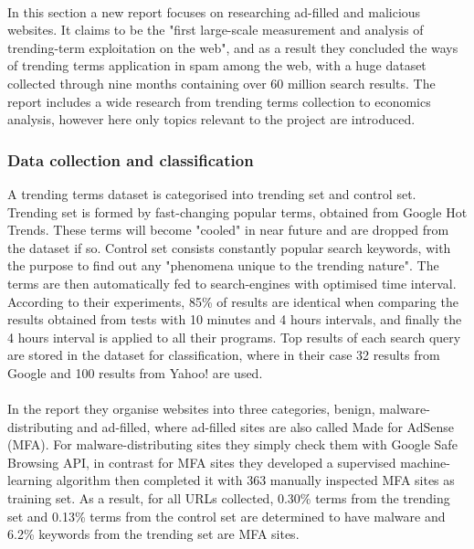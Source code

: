 \paragraph{}
In this section a new report focuses on researching ad-filled and malicious
websites.\cite{fashioncrime} It claims to be the "first large-scale measurement
and analysis of trending-term exploitation on the web", and as a result they
concluded the ways of trending terms application in spam among the web, with a
huge dataset collected through nine months containing over 60 million search
results. The report includes a wide research from trending terms collection to 
economics analysis, however here only topics relevant to the 
project are introduced. 
\subsubsection{Data collection and classification}
A trending terms dataset is categorised into trending set and control set. 
Trending set is formed by fast-changing popular terms, obtained from Google 
Hot Trends. These terms will become "cooled" in near future and are dropped 
from the dataset if so. Control set consists constantly popular search 
keywords, with the purpose to find out any "phenomena unique to the trending 
nature".\cite{fashioncrime} The terms are then automatically fed to search-engines with optimised 
time interval. According to their experiments, 85\% of results are identical 
when comparing the results obtained from tests with 10 minutes and 4 hours 
intervals, and finally the 4 hours interval is applied to all their programs. Top 
results of each search query are stored in the dataset for classification, 
where in their case 32 results from Google and 100 results from Yahoo! are used.
\paragraph{}
In the report they organise websites into three categories, benign, 
malware-distributing and ad-filled, where ad-filled sites are also called Made 
for AdSense (MFA). For malware-distributing sites they simply check them with 
Google Safe Browsing API, in contrast for MFA sites they developed a 
supervised machine-learning algorithm then completed it with 363 manually 
inspected MFA sites as training set. As a result, for all URLs collected, 
0.30\% terms from the trending set and 0.13\% terms from the control set are determined to 
have malware and 6.2\% keywords from the trending set are MFA sites. 
